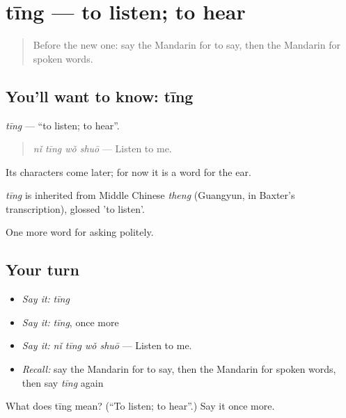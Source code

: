 \section[tīng]{tīng — to listen; to hear}

\label{lesson:ZH-C53-ting}



\begin{quote}
Before the new one: say the Mandarin for to say, then the Mandarin for spoken words.
\end{quote}

\subsection*{You'll want to know: tīng}
\emph{tīng} — \textquotedblleft{}to listen; to hear\textquotedblright{}.

\begin{quote}
\emph{nǐ tīng wǒ shuō} — Listen to me.
\end{quote}

Its characters come later; for now it is a word for the ear.

\begin{cousinweb}
\emph{tīng} is inherited from Middle Chinese \emph{theng} (Guangyun, in Baxter's transcription), glossed 'to listen'.
\end{cousinweb}

\begin{grammarlens}[title={What you've built}]
One more word for asking politely.
\end{grammarlens}

\subsection*{Your turn}
\begin{itemize}
\raggedright
  \item \emph{Say it:} \emph{tīng}
  \item \emph{Say it:} \emph{tīng}, once more
  \item \emph{Say it:} \emph{nǐ tīng wǒ shuō} — Listen to me.
  \item \emph{Recall:} say the Mandarin for to say, then the Mandarin for spoken words, then say \emph{tīng} again
\end{itemize}

\begin{tcolorbox}[breakable,colback=teal!4,colframe=teal!35!black,title={Before you move on}]
What does tīng mean? (\textquotedblleft{}To listen; to hear\textquotedblright{}.) Say it once more.
\end{tcolorbox}
